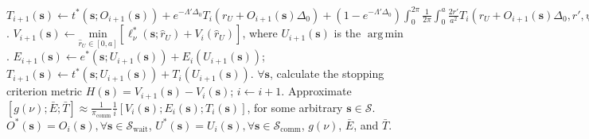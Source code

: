 \documentclass[10pt, twocolumn]{IEEEtran}
\theoremstyle{plain}
\theoremstyle{definition}
\theoremstyle{remark}
\DeclareMathOperator*{\argmin}{arg\,min}
\begin{document}
\begin{algorithm*}[t]
\begin{algorithmic}[1]
        		\vspace{0.1cm}
        		\State $T_{i{+}1}(\mathbf{s}){\gets}t^{*}(\mathbf{s};O_{i{+}1}(\mathbf{s})){+}e^{-\Lambda'\Delta_{0}}T_{i}(r_{U}{+}O_{i{+}1}(\mathbf{s})\Delta_{0}){+}\left(1{-}e^{-\Lambda'\Delta_{0}}\right)\int_{0}^{2\pi}\frac{1}{2\pi}\int_{0}^{a}\frac{2r'}{a^{2}}T_{i}(r_{U}{+}O_{i{+}1}(\mathbf{s})\Delta_{0},r',\psi')\mathrm{d}r'\mathrm{d}\psi'$.
        		\vspace{0.1cm}
        	\EndFor
        	\vspace{0.1cm}
        	    \vspace{0.1cm}
        		\State $V_{i{+}1}(\mathbf{s}){\gets}\underset{\hat{r}_{U}{\in}[0,a]}{\mathrm{min}}\left[\ell_{\nu}^{*}(\mathbf{s};\hat{r}_{U}){+}V_{i}(\hat{r}_{U})\right]$, where $U_{i{+}1}(\mathbf{s})$ is the $\argmin$.
        		\vspace{0.1cm}
        		\State $E_{i{+}1}(\mathbf{s}){\gets}e^{*}(\mathbf{s};U_{i{+}1}(\mathbf{s})){+}E_{i}(U_{i{+}1}(\mathbf{s}))$; $T_{i{+}1}(\mathbf{s}){\gets}t^{*}(\mathbf{s};U_{i{+}1}(\mathbf{s})){+}T_{i}(U_{i{+}1}(\mathbf{s}))$.
        		\vspace{0.1cm}
        	\EndFor
        	\vspace{0.1cm}
        	\State ${\forall}\mathbf{s}$, calculate the stopping criterion metric $H(\mathbf{s}){=}V_{i{+}1}(\mathbf{s}){-}V_{i}(\mathbf{s})$; $i{\gets}i{+}1$.
        	\vspace{0.1cm}
    \vspace{0.1cm}
    \State Approximate $\left[g(\nu);\bar{E};\bar{T}\right]{\approx}\frac{1}{\pi_{\mathrm{comm}}}\frac{1}{i}\left[V_{i}(\mathbf{s});E_{i}(\mathbf{s});T_{i}(\mathbf{s})\right]$, for some arbitrary $\mathbf{s}{\in}\mathcal{S}$.
    \vspace{0.1cm}\\
    \Return $O^{*}(\mathbf{s})=O_{i}(\mathbf{s}),{\forall}\mathbf{s}{\in}\mathcal{S}_{\mathrm{wait}}$, $U^{*}(\mathbf{s}){=}U_{i}(\mathbf{s}),{\forall}\mathbf{s}{\in} \mathcal{S}_{\mathrm{comm}}$, $g(\nu)$, $\bar{E}$, and $\bar{T}$.
    \end{algorithmic}
\end{algorithm*}
\end{document}
